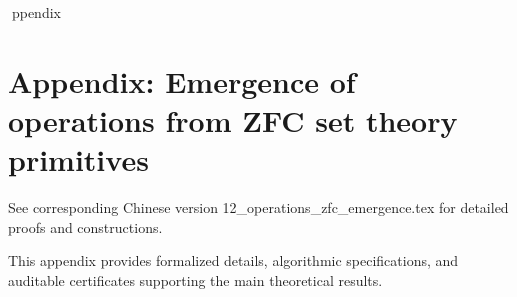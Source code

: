 ppendix

\section*{Appendix: Emergence of operations from ZFC set theory primitives}

See corresponding Chinese version 12_operations_zfc_emergence.tex for detailed proofs and constructions.

This appendix provides formalized details, algorithmic specifications, and auditable certificates supporting the main theoretical results.
